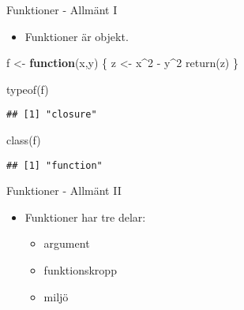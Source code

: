 \documentclass[
  11pt,
  ignorenonframetext,
]{beamer}
\newenvironment{Shaded}{\begin{snugshade}}{\end{snugshade}}
\newcommand{\ControlFlowTok}[1]{\textcolor[rgb]{0.13,0.29,0.53}{\textbf{#1}}}
\newcommand{\DecValTok}[1]{\textcolor[rgb]{0.00,0.00,0.81}{#1}}
\newcommand{\FunctionTok}[1]{\textcolor[rgb]{0.00,0.00,0.00}{#1}}
\newcommand{\NormalTok}[1]{#1}
\newcommand{\OtherTok}[1]{\textcolor[rgb]{0.56,0.35,0.01}{#1}}
\newcommand{\SpecialCharTok}[1]{\textcolor[rgb]{0.00,0.00,0.00}{#1}}
\providecommand{\tightlist}{%
  \setlength{\itemsep}{0pt}\setlength{\parskip}{0pt}}
\begin{document}
\begin{frame}[fragile]{Funktioner - Allmänt I}
\protect\hypertarget{funktioner---allmuxe4nt-i}{}
\begin{itemize}
\tightlist
\item
  Funktioner är objekt.
\end{itemize}

\begin{Shaded}
\begin{Highlighting}[]
\NormalTok{f }\OtherTok{\textless{}{-}} \ControlFlowTok{function}\NormalTok{(x,y) \{}
\NormalTok{  z }\OtherTok{\textless{}{-}}\NormalTok{ x}\SpecialCharTok{\^{}}\DecValTok{2} \SpecialCharTok{{-}}\NormalTok{ y}\SpecialCharTok{\^{}}\DecValTok{2}
  \FunctionTok{return}\NormalTok{(z)}
\NormalTok{\}}
\end{Highlighting}
\end{Shaded}

\begin{Shaded}
\begin{Highlighting}[]
\FunctionTok{typeof}\NormalTok{(f)}
\end{Highlighting}
\end{Shaded}

\begin{verbatim}
## [1] "closure"
\end{verbatim}

\begin{Shaded}
\begin{Highlighting}[]
\FunctionTok{class}\NormalTok{(f)}
\end{Highlighting}
\end{Shaded}

\begin{verbatim}
## [1] "function"
\end{verbatim}
\end{frame}

\begin{frame}{Funktioner - Allmänt II}
\protect\hypertarget{funktioner---allmuxe4nt-ii}{}
\begin{itemize}
\tightlist
\item
  Funktioner har tre delar:

  \begin{itemize}
  \tightlist
  \item
    argument
  \item
    funktionskropp
  \item
    miljö
  \end{itemize}
\end{itemize}
\end{frame}
\end{document}
